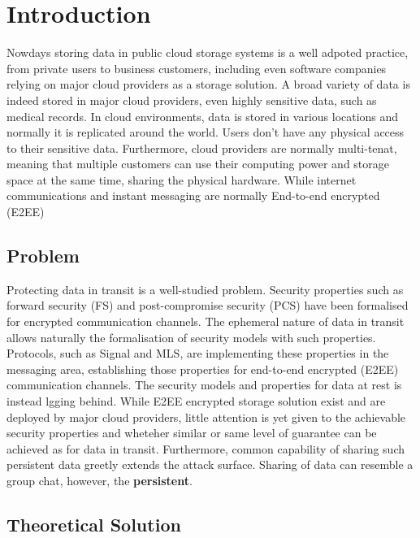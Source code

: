 \chapter{Introduction}

Nowdays storing data in public cloud storage systems is a well adpoted practice,
from private users to business customers, 
including even software companies relying on major cloud providers as a storage solution.
A broad variety of data is indeed stored in major cloud providers, even highly sensitive data,
such as medical records.
In cloud environments, data is stored in various locations and normally it is replicated
around the world. Users don't have any physical access to their sensitive data.
Furthermore, cloud providers are normally multi-tenat, meaning that multiple customers
can use their computing power and storage space at the same time, sharing the physical hardware.
While internet communications and instant messaging are normally End-to-end encrypted (E2EE)




\section{Problem}

Protecting data in transit is a well-studied problem.
Security properties such as forward security (FS) and post-compromise security (PCS)
have been formalised for encrypted communication channels.
The ephemeral nature of data in transit allows naturally the formalisation of security models
with such properties.
Protocols, such as Signal and MLS, are implementing these properties in the messaging area,
establishing those properties for end-to-end encrypted (E2EE) communication channels.  
The security models and properties for data at rest is instead lgging behind.
While E2EE encrypted storage solution exist and are deployed by major cloud providers,
little attention is yet given to the achievable security properties 
and wheteher similar or same level of guarantee can be achieved as for data in transit.
Furthermore, common capability of sharing such persistent data greetly extends the attack surface.
Sharing of data can resemble a group chat, however, the \textbf{persistent}.



\section{Theoretical Solution}


